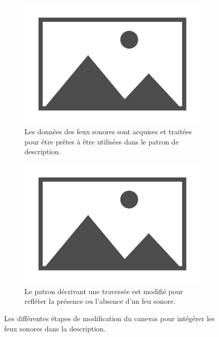\begin{figure}[ht]
    \centering
    \begin{subfigure}[t]{0.49\linewidth}
        \includegraphics[width=\textwidth]{images/placeholder.jpg}
        \caption{Les données des feux sonores sont acquises et traitées pour être prêtes à être utilisées dans le patron de description.}
    \end{subfigure}
    \begin{subfigure}[t]{0.49\linewidth}
        \includegraphics[width=\textwidth]{images/placeholder.jpg}
        \caption{Le patron décrivant une traversée est modifié pour refléter la présence ou l'absence d'un feu sonore.}
    \end{subfigure}
    \caption{Les différentes étapes de modification du canevas pour intégérer les feux sonores dans la description.}
    \label{fig:evaluation_ex_nouvelle_information_avec_ajout}
\end{figure}

